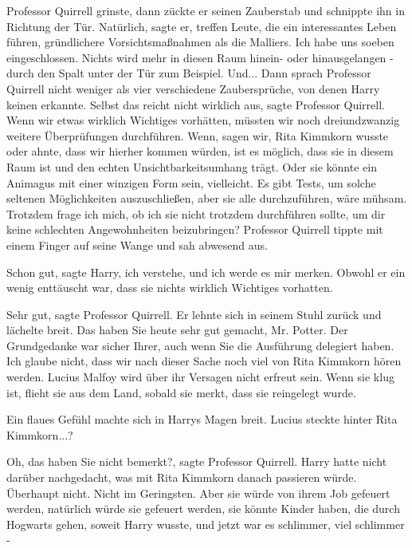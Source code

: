 Professor Quirrell grinste, dann zückte er seinen Zauberstab und schnippte ihn
in Richtung der Tür. \glqq{}Natürlich\grqq{}, sagte er, \glqq{}treffen Leute, die
ein interessantes Leben führen, gründlichere Vorsichtsmaßnahmen als die
Malliers. Ich habe uns soeben eingeschlossen. Nichts wird mehr in diesen Raum
hinein- oder hinausgelangen - durch den Spalt unter der Tür zum Beispiel.
Und...\grqq{} Dann sprach Professor Quirrell nicht weniger als vier verschiedene
Zaubersprüche, von denen Harry keinen erkannte. \glqq{}Selbst das reicht nicht
wirklich aus\grqq{}, sagte Professor Quirrell. \glqq{}Wenn wir etwas wirklich
Wichtiges vorhätten, müssten wir noch dreiundzwanzig weitere Überprüfungen
durchführen. Wenn, sagen wir, Rita Kimmkorn wusste oder ahnte, dass wir hierher
kommen würden, ist es möglich, dass sie in diesem Raum ist und den echten
Unsichtbarkeitsumhang trägt. Oder sie könnte ein Animagus mit einer winzigen
Form sein, vielleicht. Es gibt Tests, um solche seltenen Möglichkeiten
auszuschließen, aber sie alle durchzuführen, wäre mühsam. Trotzdem frage ich
mich, ob ich sie nicht trotzdem durchführen sollte, um dir keine schlechten
Angewohnheiten beizubringen?\grqq{} Professor Quirrell tippte mit einem Finger
auf seine Wange und sah abwesend aus.

\glqq{}Schon gut\grqq{}, sagte Harry, \glqq{}ich verstehe, und ich werde es mir
merken.\grqq{} Obwohl er ein wenig enttäuscht war, dass sie nichts wirklich
Wichtiges vorhatten.

\glqq{}Sehr gut\grqq{}, sagte Professor Quirrell. Er lehnte sich in seinem Stuhl
zurück und lächelte breit. \glqq{}Das haben Sie heute sehr gut gemacht, Mr.
Potter. Der Grundgedanke war sicher Ihrer, auch wenn Sie die Ausführung
delegiert haben. Ich glaube nicht, dass wir nach dieser Sache noch viel von Rita
Kimmkorn hören werden. Lucius Malfoy wird über ihr Versagen nicht erfreut sein.
Wenn sie klug ist, flieht sie aus dem Land, sobald sie merkt, dass sie
reingelegt wurde.\grqq{}

Ein flaues Gefühl machte sich in Harrys Magen breit. \glqq{}Lucius steckte hinter
Rita Kimmkorn...?\grqq{}

\glqq{}Oh, das haben Sie nicht bemerkt?\grqq{}, sagte Professor Quirrell. Harry
hatte nicht darüber nachgedacht, was mit Rita Kimmkorn danach passieren würde.
Überhaupt nicht. Nicht im Geringsten. Aber sie würde von ihrem Job gefeuert
werden, natürlich würde sie gefeuert werden, sie könnte Kinder haben, die durch
Hogwarts gehen, soweit Harry wusste, und jetzt war es schlimmer, viel schlimmer
-


